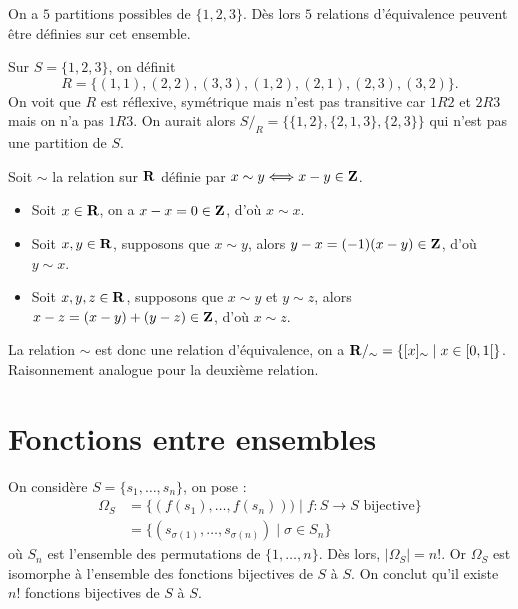 \begin{exercice}
    On a $5$ partitions possibles de $\{1,2,3\}$. Dès lors $5$ relations d'équivalence peuvent être définies sur cet ensemble.
\end{exercice}

\begin{exercice}
    Sur $S = \{1,2,3\}$, on définit
    \[
    R = \{(1,1), (2,2), (3,3), (1,2), (2,1), (2,3), (3,2)\}.
    \]
    On voit que $R$ est réflexive, symétrique mais n'est pas transitive car $1R2$ et $2R3$ mais on n'a pas $1R3$.
    On aurait alors $S /_R = \{\{1,2\}, \{2, 1, 3\}, \{2, 3\}\}$ qui n'est pas une partition de $S$.
\end{exercice}

\begin{exercice}
    Soit $\sim$ la relation sur $\mathbf{R}$ définie par $x \sim y \Longleftrightarrow x - y \in \mathbf{Z}$.
    \begin{itemize}
        \item Soit $x \in \mathbf{R}$, on a $x - x = 0 \in \mathbf{Z}$, d'où $x \sim x$.
        \item Soit $x,y \in \mathbf{R}$, supposons que $x \sim y$, alors $y - x = (-1)(x - y) \in \mathbf{Z}$, d'où $y \sim x$.
        \item Soit $x,y,z \in \mathbf{R}$, supposons que $x \sim y$ et $y \sim z$, alors $x - z = (x - y) + (y - z) \in \mathbf{Z}$, d'où $x \sim z$.
    \end{itemize}
    La relation $\sim$ est donc une relation d'équivalence, on a $\mathbf{R} /_\sim = \{[x]_\sim \mid x \in [0, 1[\}$.
    Raisonnement analogue pour la deuxième relation.
\end{exercice}

\section{Fonctions entre ensembles}

\begin{exercice}
    On considère $S = \{s_1,\dots,s_n\}$, on pose :  
    \begin{align*}
        \Omega_S &= \{(f(s_1),\dots,f(s_n))) \mid f : S \to S \text{ bijective}\} \\
                 &= \{(s_{\sigma(1)},\dots,s_{\sigma(n)}) \mid \sigma \in S_n\}
    \end{align*}
    où $S_n$ est l'ensemble des permutations de $\{1,\dots,n\}$. Dès lors, $|\Omega_S| = n!$. 
    Or $\Omega_S$ est isomorphe à l'ensemble des fonctions bijectives de $S$ à $S$. 
    On conclut qu'il existe $n!$ fonctions bijectives de $S$ à $S$.
\end{exercice}

